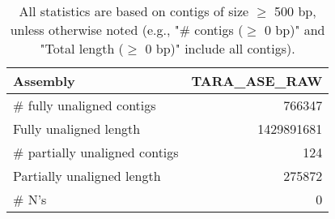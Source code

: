 \documentclass[12pt,a4paper]{article}
\begin{document}
\begin{table}[ht]
\begin{center}
\caption{All statistics are based on contigs of size $\geq$ 500 bp, unless otherwise noted (e.g., "\# contigs ($\geq$ 0 bp)" and "Total length ($\geq$ 0 bp)" include all contigs).}
\begin{tabular}{|l*{1}{|r}|}
\hline
Assembly & TARA\_ASE\_RAW \\ \hline
\# fully unaligned contigs & 766347 \\ \hline
Fully unaligned length & 1429891681 \\ \hline
\# partially unaligned contigs & 124 \\ \hline
Partially unaligned length & 275872 \\ \hline
\# N's & 0 \\ \hline
\end{tabular}
\end{center}
\end{table}
\end{document}
